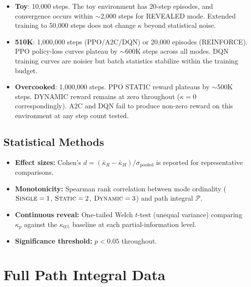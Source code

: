 \documentclass[letterpaper]{article}
\begin{document}
\begin{itemize}
\item \textbf{Toy}: 10,000 steps. The toy environment has 20-step episodes, and convergence occurs within $\sim$2,000 steps for REVEALED mode. Extended training to 50,000 steps does not change $\kappa$ beyond statistical noise.
\item \textbf{510K}: 1,000,000 steps (PPO/A2C/DQN) or 20,000 episodes (REINFORCE). PPO policy-loss curves plateau by $\sim$600K steps across all modes. DQN training curves are noisier but batch statistics stabilize within the training budget.
\item \textbf{Overcooked}: 1,000,000 steps. PPO STATIC reward plateaus by $\sim$500K steps. DYNAMIC reward remains at zero throughout ($\kappa = 0$ correspondingly). A2C and DQN fail to produce non-zero reward on this environment at any step count tested.
\end{itemize}

\subsection{Statistical Methods}

\begin{itemize}
\item \textbf{Effect sizes:} Cohen's $d = (\bar{\kappa}_R - \bar{\kappa}_H) / \sigma_{\text{pooled}}$ is reported for representative comparisons.
\item \textbf{Monotonicity:} Spearman rank correlation between mode ordinality ($\textsc{Single}=1$, $\textsc{Static}=2$, $\textsc{Dynamic}=3$) and path integral $\mathcal{P}$.
\item \textbf{Continuous reveal:} One-tailed Welch $t$-test (unequal variance) comparing $\kappa_{p}$ against the $\kappa_{0\%}$ baseline at each partial-information level.
\item \textbf{Significance threshold:} $p < 0.05$ throughout.
\end{itemize}

\section{Full Path Integral Data}
\end{document}
